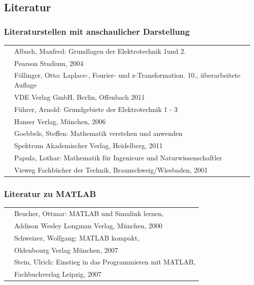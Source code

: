 \clearpage

\subsection{Literatur}


\subsubsection{Literaturstellen mit anschaulicher Darstellung}

\begin{tabular}{|p{0.6in}|p{5.7in}|} \hline 
[Alba04] & Albach, Manfred: Grundlagen der Elektrotechnik 1und 2.\\ 
& Pearson Studium, 2004 \\ \hline 
[Foel11] & Föllinger, Otto: Laplace-, Fourier- und z-Transformation. 10., überarbeitete Auflage \\ 
& VDE Verlag GmbH, Berlin, Offenbach 2011 \\ \hline 
[Führ06] & Führer, Arnold: Grundgebiete der Elektrotechnik 1 - 3 \\
& Hanser Verlag, München, 2006\\ \hline 
[Goeb11] & Goebbels, Steffen: Mathematik verstehen und anwenden \\
& Spektrum Akademischer Verlag, Heidelberg, 2011 \\ \hline 
[Papu01] & Papula, Lothar: Mathematik für Ingenieure und Naturwissenschaftler \\
& Vieweg Fachbücher der Technik, Braunschweig/Wiesbaden, 2001 \\ \hline 
\end{tabular}


\subsubsection{Literatur zu MATLAB}

\begin{tabular}{|p{0.6in}|p{5.7in}|} \hline 
[Beuc00] & Beucher, Ottmar: MATLAB und Simulink lernen,\\
& Addison Wesley Longman Verlag, München, 2000\\ \hline 
[Schw07] & Schweizer, Wolfgang: MATLAB kompakt, \\ 
& Oldenbourg Verlag München, 2007\\ \hline 
[Stei07] & Stein, Ulrich: Einstieg in das Programmieren mit MATLAB,\\
& Fachbuchverlag Leipzig, 2007\\ \hline 
\end{tabular}


